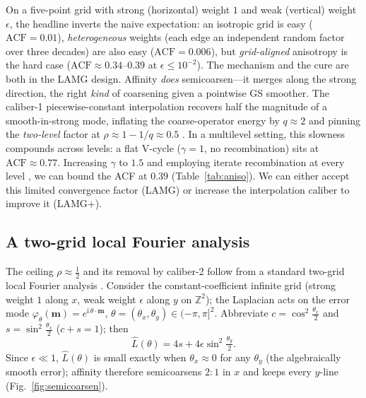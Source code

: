 \documentclass{siamart220329}
\newcommand{\acf}{\mathrm{ACF}}
\begin{document}
On a five-point grid with strong (horizontal) weight $1$ and weak (vertical) weight $\epsilon$,
the headline inverts the naive expectation: an isotropic grid is easy ($\acf=0.01$),
\emph{heterogeneous} weights (each edge an independent random factor over three decades) are
also easy ($\acf=0.006$), but \emph{grid-aligned} anisotropy is the hard case
($\acf\approx0.34$--$0.39$ at $\epsilon\le10^{-2}$). The mechanism and the cure are both in the
LAMG design. Affinity \emph{does} semicoarsen---it merges along the strong direction, the right
\emph{kind} of coarsening given a pointwise GS smoother. The caliber-1 piecewise-constant interpolation recovers half the magnitude of a
smooth-in-strong mode, inflating the coarse-operator energy by $q\approx2$ and pinning the
\emph{two-level} factor at $\rho\approx1-1/q\approx0.5$ \cite[\S3.4.3]{lamg}. In a multilevel setting, this slowness compounds across levels: a flat V-cycle ($\gamma=1$, no recombination) sits at $\acf\approx0.77$. Increasing $\gamma$ to $1.5$ and employing iterate recombination at every level \cite[\S3.4.5]{lamg}, we can bound the ACF at $0.39$ (Table~\ref{tab:aniso}). We can either accept this limited convergence factor (LAMG) or increase the interpolation caliber to improve it (LAMG+).

\subsection{A two-grid local Fourier analysis}\label{sec:lfa}
The ceiling $\rho\approx\tfrac12$ and its removal by
caliber-2 follow from a standard two-grid local Fourier analysis \cite[\S4.1]{guide}. Consider the
constant-coefficient infinite grid (strong weight $1$ along $x$, weak weight $\epsilon$ along $y$ on
$\mathbb Z^2$); the Laplacian acts on the error mode
$\varphi_\theta(\mathbf m)=e^{\mathrm{i}\,\theta\cdot\mathbf m}$,
$\theta=(\theta_x,\theta_y)\in(-\pi,\pi]^2$. Abbreviate $c=\cos^2\tfrac{\theta_x}{2}$ and
$s=\sin^2\tfrac{\theta_x}{2}$ ($c{+}s=1$); then
\begin{equation}\label{eq:Lsymbol}
\hat L(\theta)=4s+4\epsilon\sin^2\tfrac{\theta_y}{2}.
\end{equation}
Since $\epsilon\ll1$, $\hat L(\theta)$ is small exactly when $\theta_x\approx0$ for any $\theta_y$ (the
algebraically smooth error); affinity therefore semicoarsens $2{:}1$ in $x$ and keeps every $y$-line
(Fig.~\ref{fig:semicoarsen}).
\end{document}
